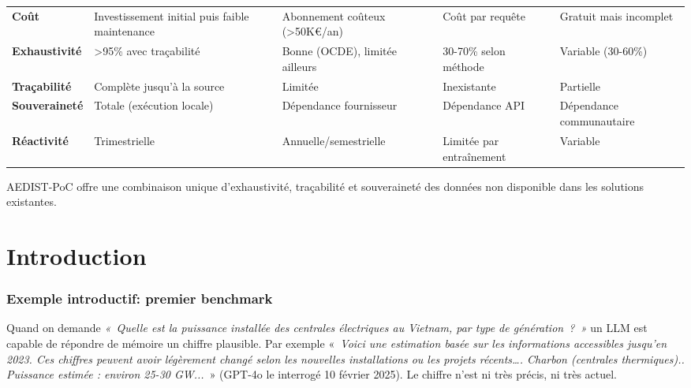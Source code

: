 \documentclass[a4paper,11pt]{report}
\begin{document}
\begin{longtable}[]{@{}lllll@{}}
\toprule\noalign{}
& & & & \\
\midrule\noalign{}
\endhead
\bottomrule\noalign{}
\endlastfoot
\textbf{Coût} & Investissement initial puis faible maintenance & Abonnement coûteux (\textgreater50K€/an) & Coût par requête & Gratuit mais incomplet \\
\textbf{Exhaustivité} & \textgreater95\% avec traçabilité & Bonne (OCDE), limitée ailleurs & 30-70\% selon méthode & Variable (30-60\%) \\
\textbf{Traçabilité} & Complète jusqu'à la source & Limitée & Inexistante & Partielle \\
\textbf{Souveraineté} & Totale (exécution locale) & Dépendance fournisseur & Dépendance API & Dépendance communautaire \\
\textbf{Réactivité} & Trimestrielle & Annuelle/semestrielle & Limitée par entraînement & Variable \\
\end{longtable}

AEDIST-PoC offre une combinaison unique d'exhaustivité, traçabilité et souveraineté des données non disponible dans les solutions existantes.

\chapter{Introduction}\label{introduction}

\subsection{Exemple introductif: premier benchmark}\label{exemple-introductif-premier-benchmark}

Quand on demande \emph{\emph{«~Quelle est la puissance installée des centrales électriques au Vietnam, par type de génération~?~»}} un LLM est capable de répondre de mémoire un chiffre plausible. Par exemple «\emph{\emph{~}Voici une estimation basée sur les informations accessibles jusqu'en 2023. Ces chiffres peuvent avoir légèrement changé selon les nouvelles installations ou les projets récents\ldots. \emph{Charbon (centrales thermiques).. Puissance estimée }: environ \emph{25-30 GW...}}~» (GPT-4o le interrogé 10 février 2025). Le chiffre n'est ni très précis, ni très actuel.
\end{document}
